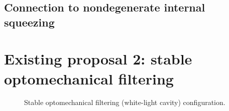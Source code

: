 \subsection{Connection to nondegenerate internal squeezing}






\section{Existing proposal 2: stable optomechanical filtering}

\begin{figure}
	\centering
	\caption{Stable optomechanical filtering (white-light cavity) configuration.}
	\label{fig:}
\end{figure}



